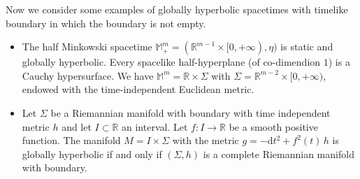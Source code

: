 \begin{Example}
	Now we consider some examples of globally hyperbolic spacetimes with timelike boundary in which the boundary is not empty.
	\begin{itemize}
		\item The half Minkowski spacetime $\mathbb{M}_+^m=(\mathbb{R}^{m-1}\times[0,+\infty),\eta)$ is static and globally hyperbolic. Every spacelike half-hyperplane (of co-dimendion $1$) is a Cauchy hypersurface. We have $\mathbb{M}^m=\mathbb{R}\times \Sigma$ with $\Sigma= \mathbb{R}^{m-2}\times[0,+\infty)$, endowed with the time-independent Euclidean metric.
		\item Let $\Sigma$ be a Riemannian manifold with boundary with time independent metric $h$ and let $I\subset\mathbb{R}$ an interval. Let $f: I\to\mathbb{R}$	be a smooth positive function. The manifold $M=I \times \Sigma$ with the metric $g = -\mathrm{d} t^2 + f^2(t)\, h$ is globally hyperbolic if and only if $(\Sigma,h)$ is a complete Riemannian manifold with boundary.
	\end{itemize}
\end{Example}

